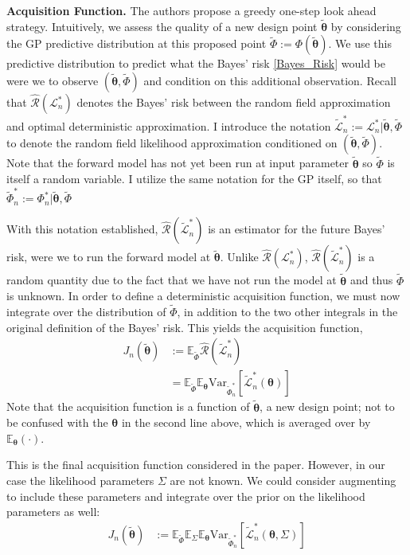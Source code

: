 \documentclass[12pt]{article}
\newcommand{\E}{\mathbb{E}}
\newcommand{\Var}{\mathrm{Var}}
\newcommand{\btheta}{\boldsymbol{\theta}}
\begin{document}
\bigskip
\noindent
\textbf{Acquisition Function.}
The authors propose a greedy one-step look ahead strategy. Intuitively, we assess the quality of a new design point $\tilde{\btheta}$ by considering the GP predictive distribution 
at this proposed point $\tilde{\Phi} := \Phi(\tilde{\btheta})$. We use this predictive distribution to predict what the Bayes' risk \ref{Bayes_Risk} would be were we to observe 
$(\tilde{\btheta}, \tilde{\Phi})$ and condition on this additional observation. Recall that $\hat{\mathcal{R}}(\mathcal{L}_n^*)$ denotes the Bayes' risk between the 
random field approximation and optimal deterministic approximation. I introduce the notation $\tilde{\mathcal{L}}^*_n := \mathcal{L}^*_n|\tilde{\btheta}, \tilde{\Phi}$ to denote the 
random field likelihood approximation conditioned on $(\tilde{\btheta}, \tilde{\Phi})$. Note that the forward model has not yet been run at input parameter $\tilde{\btheta}$ so 
$\tilde{\Phi}$ is itself a random variable. I utilize the same notation for the GP itself, so that $\tilde{\Phi}^*_n := \Phi^*_n|\tilde{\btheta}, \tilde{\Phi}$

With this notation established, $\hat{\mathcal{R}}(\tilde{\mathcal{L}}^*_n)$ is an estimator for the future Bayes' risk, were we 
to run the forward model at $\tilde{\btheta}$. Unlike $\hat{\mathcal{R}}(\mathcal{L}^*_n)$, $\hat{\mathcal{R}}(\tilde{\mathcal{L}}^*_n)$ is a random quantity due to the fact that 
we have not run the model at $\tilde{\btheta}$ and thus $\tilde{\Phi}$ is unknown. In order to define a deterministic acquisition function, we must now integrate over the distribution of $\tilde{\Phi}$, in addition to the two other 
integrals in the original definition of the Bayes' risk. This yields the acquisition function, 
\begin{align}
J_n(\tilde{\btheta}) &:=  \E_{\tilde{\Phi}} \hat{\mathcal{R}}(\tilde{\mathcal{L}}^*_n) \\ 
			     &= \E_{\tilde{\Phi}} \E_{\btheta} \Var_{\tilde{\Phi}_n^*}\left[\tilde{\mathcal{L}}_n^*(\btheta) \right]
\end{align}
Note that the acquisition function is a function of $\tilde{\btheta}$, a new design point; not to be confused with the $\btheta$ in the second line above, which is averaged over by 
$\E_{\btheta}(\cdot)$. 

This is the final acquisition function considered in the paper. However, in our case the likelihood parameters $\Sigma$ are not known. We could consider augmenting to include these 
parameters and integrate over the prior on the likelihood parameters as well: 
\begin{align}
J_n(\tilde{\btheta}) &:= \E_{\tilde{\Phi}} \E_{\Sigma} \E_{\btheta} \Var_{\tilde{\Phi}_n^*}\left[\tilde{\mathcal{L}}_n^*(\btheta, \Sigma) \right]
\end{align}
\end{document}
